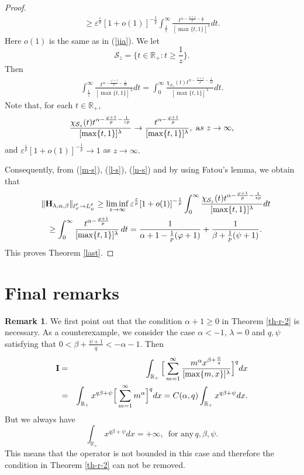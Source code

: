 \documentclass[10pt]{amsart}
\theoremstyle{definition}    %
\newtheorem{remark}[theorem]{Remark}
\numberwithin{equation}{section}
\begin{document}
\begin{proof}
\begin{eqnarray}
\geq {\varepsilon}^{\frac{\varepsilon}{p}}[1+o(1)]^{-\frac{1}{p}}\int_{\frac{1}{z}}^{\infty}\frac{t^{\alpha-\frac{\varphi+1}{p}-\frac{\varepsilon}{p}}}{[\max\{t,1\}]^{\lambda}}dt.\end{eqnarray}
Here $o(1)$ is the same as in (\ref{jia}). We let 
$$\mathcal{S}_{{z}}=\{t\in \mathbb{R}_{+}: t \geq \frac{1}{{z}}\}.$$
Then 
\begin{eqnarray}\label{l-s}\int_{\frac{1}{z}}^{\infty}\frac{t^{\alpha-\frac{\varphi+1}{p}-\frac{1}{{z}p}}}{[\max\{t,1\}]^{\lambda}}dt
=\int_{0}^{\infty}\frac{\chi_{\mathcal{S}_{z}}(t)t^{\alpha-\frac{\varphi+1}{p}-\frac{1}{{z}p}}}{[\max\{t,1\}]^{\lambda}}dt. 
\end{eqnarray}
Note that, for each $t\in \mathbb{R}_{+}$,
\begin{eqnarray}\label{n-s}\frac{\chi_{\mathcal{S}_{z}}(t)t^{\alpha-\frac{\varphi+1}{p}-\frac{1}{{z}p}}}{[\max\{t,1\}]^{\lambda}}\rightarrow \frac{t^{\alpha-\frac{\varphi+1}{p}}}{[\max\{t,1\}]^{\lambda}},\,\, {\text as}\,\, {z}\rightarrow \infty,
\end{eqnarray}
and $ {\varepsilon}^{\frac{\varepsilon}{p}}[1+o(1)]^{-\frac{1}{p}}\rightarrow 1$ as ${z}\rightarrow \infty.$ 

Consequently, from (\ref{m-s}), (\ref{l-s}), (\ref{n-s}) and by using Fatou's lemma, we obtain that 
\begin{eqnarray*} \lefteqn{\|\mathbf{H}_{\lambda, \alpha, \beta}\|_{l_{\varphi}^p \rightarrow L_{\psi}^p} \geq \liminf_{z\to \infty} {\varepsilon}^{\frac{\varepsilon}{p}}[1+o(1)]^{-\frac{1}{p}}\int_{0}^{\infty}\frac{\chi_{\mathcal{S}_{z}}(t)t^{\alpha-\frac{\varphi+1}{p}-\frac{1}{{z}p}}}{[\max\{t,1\}]^{\lambda}}dt}\nonumber \\
&&\geq 
\int_{0}^{\infty} \frac{t^{\alpha-\frac{\varphi+1}{p}}}{[\max\{t,1\}]^{\lambda}}\,dt=\frac{1}{\alpha+1-\frac{1}{p}(\varphi+1)}+\frac{1}{\beta+\frac{1}{p}(\psi+1)}. \end{eqnarray*}
This proves Theorem \ref{last}.
\end{proof} 
\section{{\bf Final remarks}}
\begin{remark}We first point out that the condition $\alpha+1\geq 0$ in Theorem \ref{th-r-2} is necessary. As a counterexample, we consider the case $\alpha<-1$, $\lambda=0$ and $q, \psi$ satisfying that 
$0<\beta+\frac{\psi+1}{q}<-\alpha-1$.
Then 
\begin{eqnarray}
{\bf I}&=&\int_{\mathbb{R}_{+}}\Big[\sum_{m=1}^{\infty}\frac{m^{\alpha}x^{\beta+\frac{\psi}{q}}}{[\max\{m,x\}]^{\lambda}}\Big]^q dx\nonumber
\\&=&
\int_{\mathbb{R}_{+}}x^{q\beta+\psi}\Big[\sum_{m=1}^{\infty}m^{\alpha}\Big]^q dx=C(\alpha, q)\int_{\mathbb{R}_{+}}x^{q\beta+\psi}dx. \nonumber
\end{eqnarray}
But we always have \[\int_{\mathbb{R}_{+}}x^{q\beta+\psi}dx=+\infty, \,{\text{ for any}}\, q,\beta, \psi.\] This means that the operator is not bounded in this case and therefore the condition in Theorem \ref{th-r-2} can not be removed. \end{remark}
\end{document}
